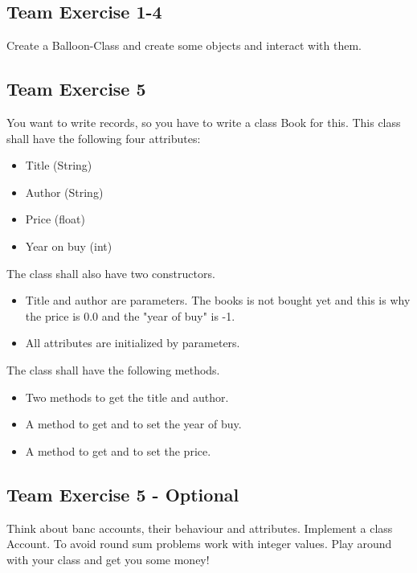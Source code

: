 \newpage
\subsection{Team Exercise 1-4}
Create a Balloon-Class and create some objects and interact with them.



\newpage
\subsection{Team Exercise 5}
You want to write records, so you have to write a class Book for this.
This class shall have the following four attributes:
\begin{itemize}
	\item Title (String)
	\item Author (String)
	\item Price (float)
	\item Year on buy (int)
\end{itemize}

\noindent
The class shall also have two constructors.
\begin{itemize}
	\item Title and author are parameters. The books is not bought yet and
		this is why the price is 0.0 and the "year of buy" is -1.
	\item All attributes are initialized by parameters.
\end{itemize}

\noindent
The class shall have the following methods.
\begin{itemize}
	\item Two methods to get the title and author.
	\item A method to get and to set the year of buy.
	\item A method to get and to set the price.
\end{itemize}




\newpage
\subsection{Team Exercise 5 - Optional}
Think about banc accounts, their behaviour and attributes.
Implement a class Account. To avoid round sum problems work with
integer values. Play around with your class and get you some money!

